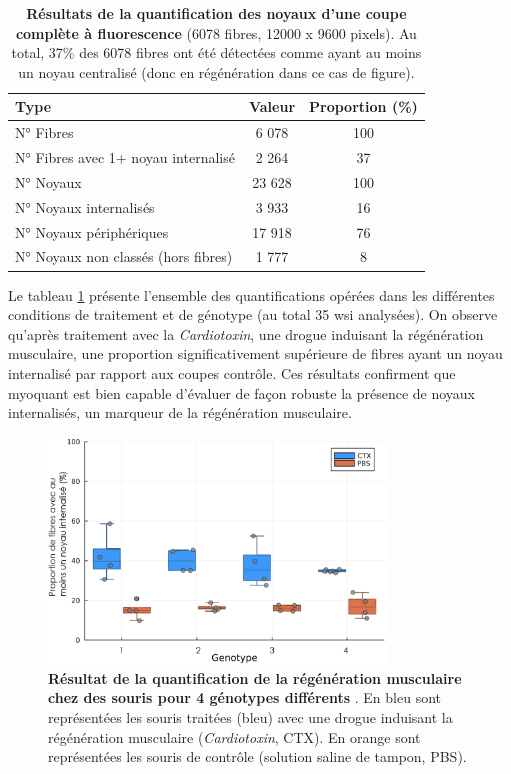 \begin{table}[!htbp]
\centering
\caption[Résultats de la quantification des noyaux d'une coupe complète à fluorescence]{\textbf{Résultats de la quantification des noyaux d'une coupe complète à fluorescence} (6078 fibres, 12000 x 9600 pixels). Au total, 37\% des 6078 fibres ont été détectées comme ayant au moins un noyau centralisé (donc en régénération dans ce cas de figure).}
\label{tab:myoquant_fluo_results}
\begin{tabular}{|l|c|c|}
\hline
\textbf{Type} & \textbf{Valeur} & \textbf{Proportion (\%)} \\
\hline
N° Fibres & 6 078 & 100 \\
\hline
N° Fibres avec 1+ noyau internalisé & 2 264 & 37 \\
\hline
\hline
N° Noyaux & 23 628 & 100 \\
\hline
N° Noyaux internalisés & 3 933 & 16 \\
\hline
N° Noyaux périphériques & 17 918 & 76 \\
\hline
N° Noyaux non classés (hors fibres) & 1 777 & 8 \\
\hline
\end{tabular}
\end{table}
Le tableau \ref{fig:fluo_compil} présente l'ensemble des quantifications opérées dans les différentes conditions de traitement et de génotype (au total 35 \gls{wsi} analysées). On observe qu'après traitement avec la \textit{Cardiotoxin}, une drogue induisant la régénération musculaire, une proportion significativement supérieure de fibres ayant un noyau internalisé par rapport aux coupes contrôle. Ces résultats confirment que \gls{myoquant} est bien capable d'évaluer de façon robuste la présence de noyaux internalisés, un marqueur de la régénération musculaire.

\begin{figure}[!htbp]
 \centering
 \includegraphics[width=0.8\textwidth]{figures/fluo_compil.png}
 \caption[Résultat de la quantification de la régénération musculaire]{\textbf{Résultat de la quantification de la régénération musculaire chez des souris pour 4 génotypes différents }. En bleu sont représentées les souris traitées (bleu) avec une drogue induisant la régénération musculaire (\textit{Cardiotoxin}, CTX). En orange sont représentées les souris de contrôle (solution saline de tampon, PBS).}
 \label{fig:fluo_compil}
\end{figure}

